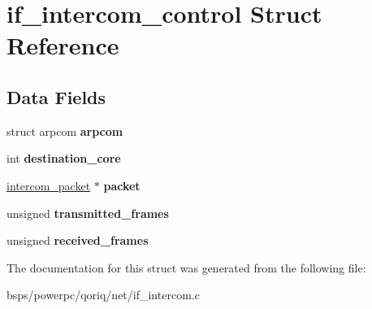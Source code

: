 \hypertarget{structif__intercom__control}{}\section{if\+\_\+intercom\+\_\+control Struct Reference}
\label{structif__intercom__control}
\subsection*{Data Fields}
\begin{DoxyCompactItemize}
\item 
\mbox{\label{structif__intercom__control_a63c8aa74faca667388cbe2834d774a04}} 
struct arpcom {\bfseries arpcom}
\item 
\mbox{\label{structif__intercom__control_a1c272353c54b21c6ebd18dc529b23745}} 
int {\bfseries destination\+\_\+core}
\item 
\mbox{\label{structif__intercom__control_a513b6afa259c32727116e90068c8e70e}} 
\mbox{\hyperlink{structintercom__packet}{intercom\+\_\+packet}} $\ast$ {\bfseries packet}
\item 
\mbox{\label{structif__intercom__control_a8ab2a6b61fd50e549c8fb7ef4425ed04}} 
unsigned {\bfseries transmitted\+\_\+frames}
\item 
\mbox{\label{structif__intercom__control_a0e385ea31849ec90ec4ff76e8c6b236f}} 
unsigned {\bfseries received\+\_\+frames}
\end{DoxyCompactItemize}


The documentation for this struct was generated from the following file\+:\begin{DoxyCompactItemize}
\item 
bsps/powerpc/qoriq/net/if\+\_\+intercom.\+c\end{DoxyCompactItemize}
